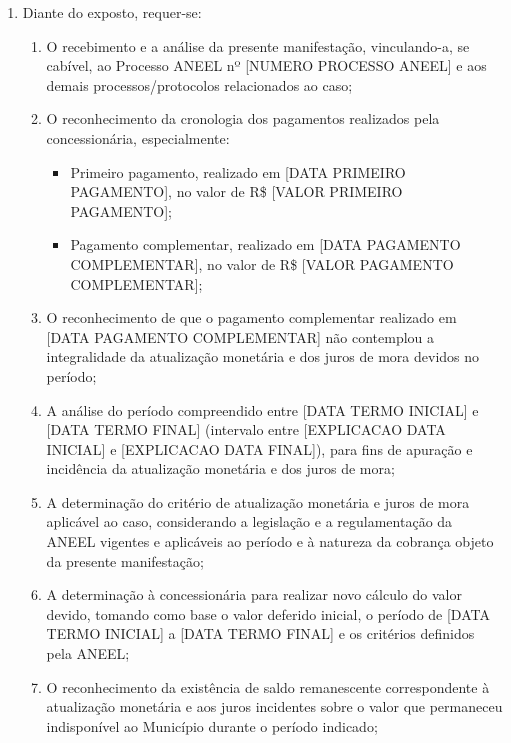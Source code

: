 \begin{enumerate}[resume]
\item Diante do exposto, requer-se:
    \begin{enumerate}
        \item O recebimento e a análise da presente manifestação, vinculando-a, se cabível, ao Processo ANEEL nº [NUMERO PROCESSO ANEEL] e aos demais processos/protocolos relacionados ao caso;

        \item O reconhecimento da cronologia dos pagamentos realizados pela concessionária, especialmente:
        \begin{itemize}
            \item Primeiro pagamento, realizado em [DATA PRIMEIRO PAGAMENTO], no valor de R\$ [VALOR PRIMEIRO PAGAMENTO];
            \item Pagamento complementar, realizado em [DATA PAGAMENTO COMPLEMENTAR], no valor de R\$ [VALOR PAGAMENTO COMPLEMENTAR];
        \end{itemize}

        \item O reconhecimento de que o pagamento complementar realizado em [DATA PAGAMENTO COMPLEMENTAR] não contemplou a integralidade da atualização monetária e dos juros de mora devidos no período;

        \item A análise do período compreendido entre [DATA TERMO INICIAL] e [DATA TERMO FINAL] (intervalo entre [EXPLICACAO DATA INICIAL] e [EXPLICACAO DATA FINAL]), para fins de apuração e incidência da atualização monetária e dos juros de mora;

        \item A determinação do critério de atualização monetária e juros de mora aplicável ao caso, considerando a legislação e a regulamentação da ANEEL vigentes e aplicáveis ao período e à natureza da cobrança objeto da presente manifestação;

        \item A determinação à concessionária para realizar novo cálculo do valor devido, tomando como base o valor deferido inicial, o período de [DATA TERMO INICIAL] a [DATA TERMO FINAL] e os critérios definidos pela ANEEL;

        \item O reconhecimento da existência de saldo remanescente correspondente à atualização monetária e aos juros incidentes sobre o valor que permaneceu indisponível ao Município durante o período indicado;


\end{enumerate}
\end{enumerate}
